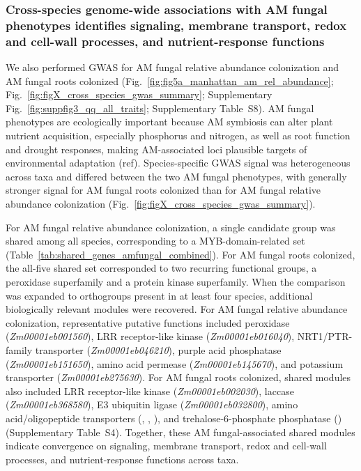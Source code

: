 \documentclass[unnumsec,webpdf,contemporary,large]{oup-authoring-template}%
\theoremstyle{thmstyleone}%
\theoremstyle{thmstyletwo}%
\theoremstyle{thmstylethree}%
\begin{document}
\subsubsection{Cross-species genome-wide associations with AM fungal phenotypes identifies signaling, membrane transport, redox and cell-wall processes, and nutrient-response functions}

We also performed GWAS for AM fungal relative abundance colonization and AM fungal roots colonized (Fig.~\ref{fig:fig5a_manhattan_am_rel_abundance}; Fig.~\ref{fig:figX_cross_species_gwas_summary}; Supplementary Fig.~\ref{fig:suppfig3_qq_all_traits}; Supplementary Table~S8). AM fungal phenotypes are ecologically important because AM symbiosis can alter plant nutrient acquisition, especially phosphorus and nitrogen, as well as root function and drought responses, making AM-associated loci plausible targets of environmental adaptation (ref). Species-specific GWAS signal was heterogeneous across taxa and differed between the two AM fungal phenotypes, with generally stronger signal for AM fungal roots colonized than for AM fungal relative abundance colonization (Fig.~\ref{fig:figX_cross_species_gwas_summary}).

For AM fungal relative abundance colonization, a single candidate group was shared among all species, corresponding to a MYB-domain-related set (Table~\ref{tab:shared_genes_amfungal_combined}). For AM fungal roots colonized, the all-five shared set corresponded to two recurring functional groups, a peroxidase superfamily and a protein kinase superfamily. When the comparison was expanded to orthogroups present in at least four species, additional biologically relevant modules were recovered. For AM fungal relative abundance colonization, representative putative functions included peroxidase (\textit{Zm00001eb001560}), LRR receptor-like kinase (\textit{Zm00001eb016040}), NRT1/PTR-family transporter (\textit{Zm00001eb046210}), purple acid phosphatase (\textit{Zm00001eb151650}), amino acid permease (\textit{Zm00001eb145670}), and potassium transporter (\textit{Zm00001eb275630}). For AM fungal roots colonized, shared modules also included LRR receptor-like kinase (\textit{Zm00001eb002030}), laccase (\textit{Zm00001eb368580}), E3 ubiquitin ligase (\textit{Zm00001eb032800}), amino acid/oligopeptide transporters (\textit{}, \textit{}, \textit{}), and trehalose-6-phosphate phosphatase (\textit{}) (Supplementary Table~S4). Together, these AM fungal-associated shared modules indicate convergence on signaling, membrane transport, redox and cell-wall processes, and nutrient-response functions across taxa.
\end{document}
